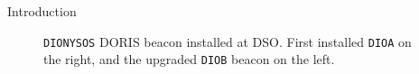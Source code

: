 \documentclass[final,a0,portrait]{beamer}
\newlength{\onecolwid}
\begin{document}
\begin{frame}[t]
\begin{columns}[t]
\begin{column}{\onecolwid}
\begin{block}{Introduction}
\begin{figure}
  \caption{\texttt{DIONYSOS} DORIS beacon installed at DSO. First installed 
  \texttt{DIOA} on the right, and the upgraded \texttt{DIOB} beacon on the 
  left.}
  \label{fig:dionysos-beacon}
\end{figure}


\end{block}
\end{column}
\end{columns}
\end{frame}
\end{document}
